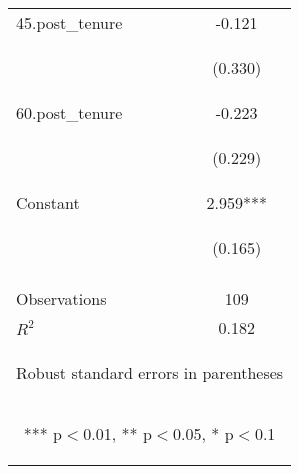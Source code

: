 \begin{center}
\begin{tabular}{lc}
45.post\_tenure & -0.121 \\
\vspace{4pt} & \begin{footnotesize}(0.330)\end{footnotesize} \\
60.post\_tenure & -0.223 \\
\vspace{4pt} & \begin{footnotesize}(0.229)\end{footnotesize} \\
Constant & 2.959*** \\
 & \begin{footnotesize}(0.165)\end{footnotesize} \\
\vspace{4pt} & \begin{footnotesize}\end{footnotesize} \\
Observations & 109 \\
 $R^2$ & 0.182 \\ \hline
\multicolumn{2}{c}{\begin{footnotesize} Robust standard errors in parentheses\end{footnotesize}} \\
\multicolumn{2}{c}{\begin{footnotesize} *** p$<$0.01, ** p$<$0.05, * p$<$0.1\end{footnotesize}} \\
\end{tabular}
\end{center}

